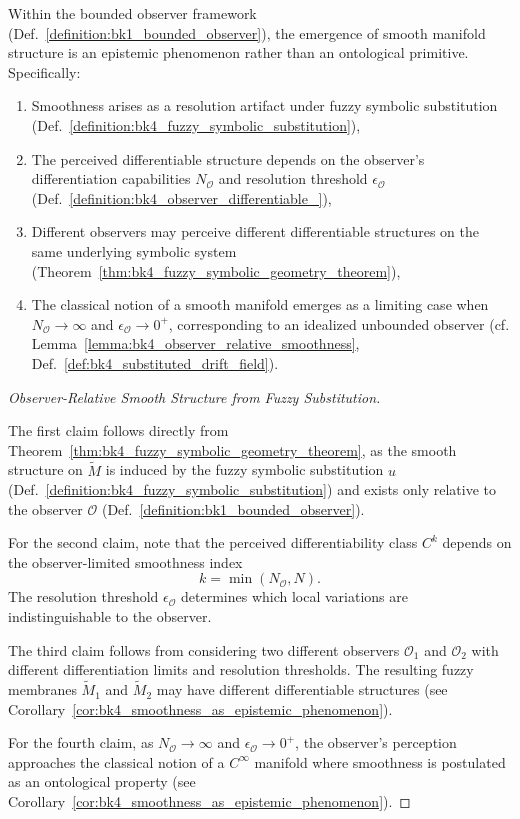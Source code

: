 \begin{corollary}
\label{cor:bk4_smoothness_as_epistemic_phenomenon}

Within the bounded observer framework (Def.~\ref{definition:bk1_bounded_observer}), the emergence of smooth manifold structure is an epistemic phenomenon rather than an ontological primitive. Specifically:

\begin{enumerate}
    \item Smoothness arises as a resolution artifact under fuzzy symbolic substitution (Def.~\ref{definition:bk4_fuzzy_symbolic_substitution}),
    \item The perceived differentiable structure depends on the observer’s differentiation capabilities $N_\mathcal{O}$ and resolution threshold $\epsilon_\mathcal{O}$ (Def.~\ref{definition:bk4_observer_differentiable_}),
    \item Different observers may perceive different differentiable structures on the same underlying symbolic system (Theorem~\ref{thm:bk4_fuzzy_symbolic_geometry_theorem}),
    \item The classical notion of a smooth manifold emerges as a limiting case when $N_\mathcal{O} \to \infty$ and $\epsilon_\mathcal{O} \to 0^+$, corresponding to an idealized unbounded observer (cf. Lemma~\ref{lemma:bk4_observer_relative_smoothness}, Def.~\ref{def:bk4_substituted_drift_field}).
\end{enumerate}
\end{corollary}
\begin{proof}[Observer-Relative Smooth Structure from Fuzzy Substitution]
\label{proof:bk4_observer_relative_smoothness}

The first claim follows directly from Theorem~\ref{thm:bk4_fuzzy_symbolic_geometry_theorem}, as the smooth structure on $\tilde{M}$ is induced by the fuzzy symbolic substitution $u$ (Def.~\ref{definition:bk4_fuzzy_symbolic_substitution}) and exists only relative to the observer $\mathcal{O}$ (Def.~\ref{definition:bk1_bounded_observer}).

For the second claim, note that the perceived differentiability class \( C^k \) depends on the observer-limited smoothness index
\[
k = \min(N_\mathcal{O}, N).
\]
The resolution threshold \( \epsilon_\mathcal{O} \) determines which local variations are indistinguishable to the observer.

The third claim follows from considering two different observers $\mathcal{O}_1$ and $\mathcal{O}_2$ with different differentiation limits and resolution thresholds. The resulting fuzzy membranes $\tilde{M}_1$ and $\tilde{M}_2$ may have different differentiable structures (see Corollary~\ref{cor:bk4_smoothness_as_epistemic_phenomenon}).

For the fourth claim, as $N_\mathcal{O} \to \infty$ and $\epsilon_\mathcal{O} \to 0^+$, the observer's perception approaches the classical notion of a $C^\infty$ manifold where smoothness is postulated as an ontological property (see Corollary~\ref{cor:bk4_smoothness_as_epistemic_phenomenon}).

\end{proof}

